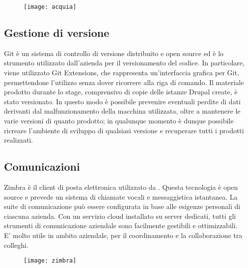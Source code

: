 		\begin{figure}[htbp]
			\begin{center}
				\texttt{[image: acquia]}
			\end{center}
		\end{figure}
	
	\subsection{Gestione di versione}
	\gls{Git} è un sistema di controllo di versione distribuito e \gls{open source} ed è lo strumento utilizzato dall'azienda per il versionamento del codice. In particolare, viene utilizzato \gls{Git Extensions}, che rappresenta un'interfaccia grafica per \gls{Git}, permettendone l'utilizzo senza dover ricorrere alla riga di comando.
	Il materiale prodotto durante lo stage, comprensivo di copie delle istanze \gls{Drupal} create, è stato versionato. In questo modo è possibile prevenire eventuali perdite di dati derivanti dal malfunzionamento della macchina utilizzata, oltre a mantenere le varie versioni di quanto prodotto; in qualunque momento è dunque possibile ricreare l'ambiente di sviluppo di qualsiasi versione e recuperare tutti i prodotti realizzati.
		
	\subsection{Comunicazioni}
	\gls{Zimbra} è il client di posta elettronica utilizzato da \nomeAzienda. Questa tecnologia è \gls{open source} e prevede un sistema di chiamate vocali e messaggistica istantanea. La suite di comunicazione può essere configurata in base alle esigenze personali di ciascuna azienda. Con un servizio cloud installato su server dedicati, tutti gli strumenti di comunicazione aziendale sono facilmente gestibili e ottimizzabili. \\
	E' molto utile in ambito aziendale, per il coordinamento e la collaborazione tra colleghi.
	
	\begin{figure}[htbp]
		\begin{center}
			\texttt{[image: zimbra]}
		\end{center}
	\end{figure}

